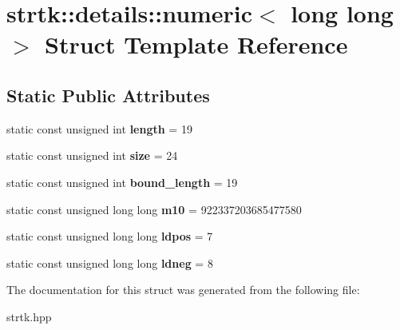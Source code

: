 \hypertarget{structstrtk_1_1details_1_1numeric_3_01long_01long_01_4}{\section{strtk\-:\-:details\-:\-:numeric$<$ long long $>$ Struct Template Reference}
\label{structstrtk_1_1details_1_1numeric_3_01long_01long_01_4}
}
\subsection*{Static Public Attributes}
\begin{DoxyCompactItemize}
\item 
\hypertarget{structstrtk_1_1details_1_1numeric_3_01long_01long_01_4_a6a9c903712e8c639dc8433748c9b97dc}{static const unsigned int {\bfseries length} = 19}\label{structstrtk_1_1details_1_1numeric_3_01long_01long_01_4_a6a9c903712e8c639dc8433748c9b97dc}

\item 
\hypertarget{structstrtk_1_1details_1_1numeric_3_01long_01long_01_4_a8e57afeea651e2fa7e692b8097f63b96}{static const unsigned int {\bfseries size} = 24}\label{structstrtk_1_1details_1_1numeric_3_01long_01long_01_4_a8e57afeea651e2fa7e692b8097f63b96}

\item 
\hypertarget{structstrtk_1_1details_1_1numeric_3_01long_01long_01_4_a05e6ec6420de61f8a74e6f7eaa0b7b98}{static const unsigned int {\bfseries bound\-\_\-length} = 19}\label{structstrtk_1_1details_1_1numeric_3_01long_01long_01_4_a05e6ec6420de61f8a74e6f7eaa0b7b98}

\item 
\hypertarget{structstrtk_1_1details_1_1numeric_3_01long_01long_01_4_ad5198724e6688b8740b450b73b9cd164}{static const unsigned long long {\bfseries m10} = 922337203685477580}\label{structstrtk_1_1details_1_1numeric_3_01long_01long_01_4_ad5198724e6688b8740b450b73b9cd164}

\item 
\hypertarget{structstrtk_1_1details_1_1numeric_3_01long_01long_01_4_a4f0776752fa247606b77ae5550ad64ee}{static const unsigned long long {\bfseries ldpos} = 7}\label{structstrtk_1_1details_1_1numeric_3_01long_01long_01_4_a4f0776752fa247606b77ae5550ad64ee}

\item 
\hypertarget{structstrtk_1_1details_1_1numeric_3_01long_01long_01_4_a87b4a7531da5d92a9104f423016605a0}{static const unsigned long long {\bfseries ldneg} = 8}\label{structstrtk_1_1details_1_1numeric_3_01long_01long_01_4_a87b4a7531da5d92a9104f423016605a0}

\end{DoxyCompactItemize}


The documentation for this struct was generated from the following file\-:\begin{DoxyCompactItemize}
\item 
strtk.\-hpp\end{DoxyCompactItemize}
